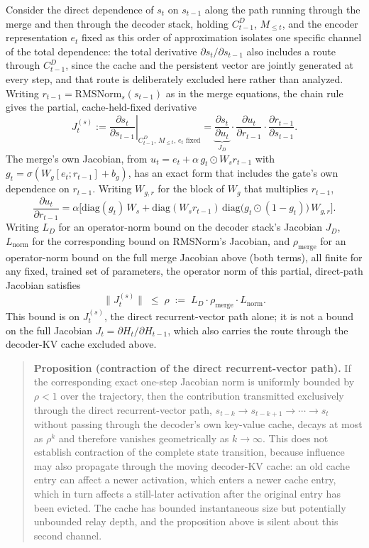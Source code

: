 \documentclass[11pt]{article}
\begin{document}
Consider the direct dependence of $s_t$ on $s_{t-1}$ along the path running through the merge and then through the decoder stack, holding $C_{t-1}^D$, $M_{\le t}$, and the encoder representation $e_t$ fixed as this order of approximation isolates one specific channel of the total dependence: the total derivative $\partial s_t/\partial s_{t-1}$ also includes a route through $C_{t-1}^D$, since the cache and the persistent vector are jointly generated at every step, and that route is deliberately excluded here rather than analyzed. Writing $r_{t-1} = \mathrm{RMSNorm}_s(s_{t-1})$ as in the merge equations, the chain rule gives the partial, cache-held-fixed derivative
\[
J_t^{(s)}
:=
\left.\frac{\partial s_t}{\partial s_{t-1}}\right|_{C_{t-1}^D,\, M_{\le t},\, e_t \text{ fixed}}
=
\underbrace{\frac{\partial s_t}{\partial u_t}}_{J_D}
\cdot
\frac{\partial u_t}{\partial r_{t-1}}
\cdot
\frac{\partial r_{t-1}}{\partial s_{t-1}}.
\]
The merge's own Jacobian, from $u_t = e_t + \alpha\, g_t \odot W_s r_{t-1}$ with $g_t=\sigma(W_g[e_t;r_{t-1}]+b_g)$, has an exact form that includes the gate's own dependence on $r_{t-1}$. Writing $W_{g,r}$ for the block of $W_g$ that multiplies $r_{t-1}$,
\[
\frac{\partial u_t}{\partial r_{t-1}}
=
\alpha\Big[
\mathrm{diag}(g_t)\, W_s
+
\mathrm{diag}(W_s r_{t-1})\,
\mathrm{diag}\big(g_t \odot (1-g_t)\big)\,
W_{g,r}
\Big].
\]
Writing $L_D$ for an operator-norm bound on the decoder stack's Jacobian $J_D$, $L_{\mathrm{norm}}$ for the corresponding bound on RMSNorm's Jacobian, and $\rho_{\mathrm{merge}}$ for an operator-norm bound on the full merge Jacobian above (both terms), all finite for any fixed, trained set of parameters, the operator norm of this partial, direct-path Jacobian satisfies
\[
\big\|J_t^{(s)}\big\|
\;\le\;
\rho
\;:=\;
L_D \cdot \rho_{\mathrm{merge}} \cdot L_{\mathrm{norm}}.
\]
This bound is on $J_t^{(s)}$, the direct recurrent-vector path alone; it is not a bound on the full Jacobian $J_t = \partial H_t / \partial H_{t-1}$, which also carries the route through the decoder-KV cache excluded above.

\begin{quote}
\textbf{Proposition (contraction of the direct recurrent-vector path).} If the corresponding exact one-step Jacobian norm is uniformly bounded by $\rho < 1$ over the trajectory, then the contribution transmitted exclusively through the direct recurrent-vector path, $s_{t-k} \to s_{t-k+1} \to \cdots \to s_t$ without passing through the decoder's own key-value cache, decays at most as $\rho^k$ and therefore vanishes geometrically as $k \to \infty$. This does not establish contraction of the complete state transition, because influence may also propagate through the moving decoder-KV cache: an old cache entry can affect a newer activation, which enters a newer cache entry, which in turn affects a still-later activation after the original entry has been evicted. The cache has bounded instantaneous size but potentially unbounded relay depth, and the proposition above is silent about this second channel.
\end{quote}
\end{document}
